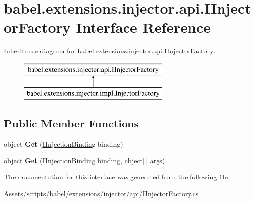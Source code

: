\hypertarget{interfacebabel_1_1extensions_1_1injector_1_1api_1_1_i_injector_factory}{\section{babel.\-extensions.\-injector.\-api.\-I\-Injector\-Factory Interface Reference}
\label{interfacebabel_1_1extensions_1_1injector_1_1api_1_1_i_injector_factory}
}
Inheritance diagram for babel.\-extensions.\-injector.\-api.\-I\-Injector\-Factory\-:\begin{figure}[H]
\begin{center}
\leavevmode
\includegraphics[height=2.000000cm]{interfacebabel_1_1extensions_1_1injector_1_1api_1_1_i_injector_factory}
\end{center}
\end{figure}
\subsection*{Public Member Functions}
\begin{DoxyCompactItemize}
\item 
\hypertarget{interfacebabel_1_1extensions_1_1injector_1_1api_1_1_i_injector_factory_a97f9e743cf15c00c31dec3cf5e3da698}{object {\bfseries Get} (\hyperlink{interfacebabel_1_1extensions_1_1injector_1_1api_1_1_i_injection_binding}{I\-Injection\-Binding} binding)}\label{interfacebabel_1_1extensions_1_1injector_1_1api_1_1_i_injector_factory_a97f9e743cf15c00c31dec3cf5e3da698}

\item 
\hypertarget{interfacebabel_1_1extensions_1_1injector_1_1api_1_1_i_injector_factory_a85603049afad206a5edb74212c215b5f}{object {\bfseries Get} (\hyperlink{interfacebabel_1_1extensions_1_1injector_1_1api_1_1_i_injection_binding}{I\-Injection\-Binding} binding, object\mbox{[}$\,$\mbox{]} args)}\label{interfacebabel_1_1extensions_1_1injector_1_1api_1_1_i_injector_factory_a85603049afad206a5edb74212c215b5f}

\end{DoxyCompactItemize}


The documentation for this interface was generated from the following file\-:\begin{DoxyCompactItemize}
\item 
Assets/scripts/babel/extensions/injector/api/I\-Injector\-Factory.\-cs\end{DoxyCompactItemize}
